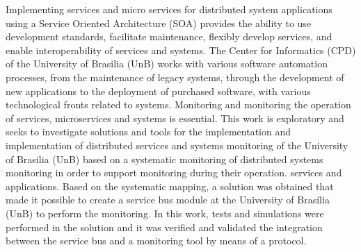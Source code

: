 Implementing services and micro services for distributed system applications using a Service Oriented Architecture (SOA) provides the ability to use development standards, facilitate maintenance, flexibly develop services, and enable interoperability of services and systems. The Center for Informatics (CPD) of the University of Brasilia (UnB) works with various software automation processes, from the maintenance of legacy systems, through the development of new applications to the deployment of purchased software, with various technological fronts related to systems. Monitoring and monitoring the operation of services, microservices and systems is essential. This work is exploratory and seeks to investigate solutions and tools for the implementation and implementation of distributed services and systems monitoring of the University of Brasilia (UnB) based on a systematic monitoring of distributed systems monitoring in order to support monitoring during their operation. services and applications. Based on the systematic mapping, a solution was obtained that made it possible to create a service bus module at the University of Brasília (UnB) to perform the monitoring. In this work, tests and simulations were performed in the solution and it was verified and validated the integration between the service bus and a monitoring tool by means of a protocol.

